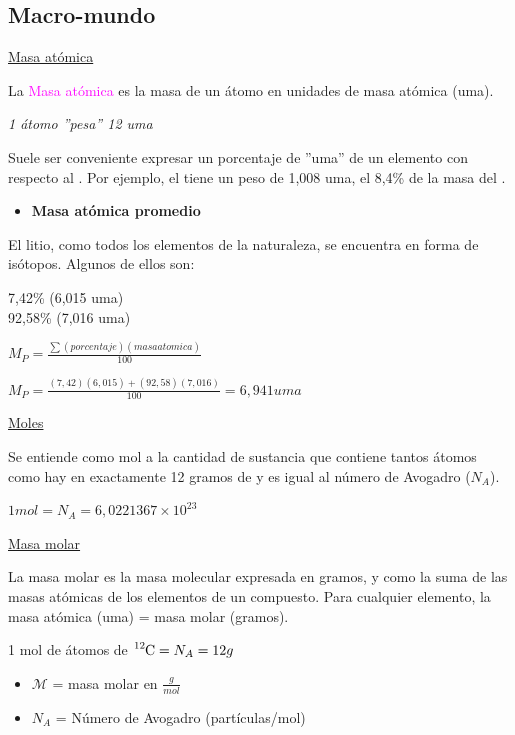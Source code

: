     \subsection{Macro-mundo}
        \begin{center} \underline{Masa atómica} \end{center}
            \indent La \textcolor{magenta}{Masa atómica} es la masa de un átomo en unidades de masa atómica (uma).
            \begin{center} \textit{1 átomo  ''pesa'' 12 uma} \end{center}
            \indent Suele ser conveniente expresar un porcentaje de ''uma'' de un elemento con respecto al . Por ejemplo, el  tiene un peso de 1,008 uma, el 8,4\% de la masa del .
            \begin{itemize} \item \textbf{Masa atómica promedio} \end{itemize}
            \indent El litio, como todos los elementos de la naturaleza, se encuentra en forma de isótopos. Algunos de ellos son: \begin{center} 7,42\%  (6,015 uma) \\ 92,58\%  (7,016 uma) \end{center}
            \begin{center} $M_P = \frac{\sum{(porcentaje)(masa atomica)}}{100}$ \end{center}
            \begin{center} $M_P = \frac{(7,42)(6,015) + (92,58)(7,016)}{100} = 6,941 uma$ \end{center}

        \begin{center} \underline{Moles} \end{center}
            \indent Se entiende como mol a la cantidad de sustancia que contiene tantos átomos como hay en exactamente 12 gramos de  y es igual al número de Avogadro ($N_A$).
            \begin{center} $1 mol = N_A = 6,0221367 \times 10^{23}$ \end{center}

        \begin{center} \underline{Masa molar} \end{center}
            \indent La masa molar es la masa molecular expresada en gramos, y como la suma de las masas atómicas de los elementos de un compuesto. Para cualquier elemento, la masa atómica (uma) = masa molar (gramos).
            \begin{center} 1 mol de átomos de $\ce{^{12}_{}C} = N_A = 12g$ \end{center}
            \begin{itemize}
                \item $\mathcal{M}$ = masa molar en $\frac{g}{mol}$ 
                \item $N_A$ = Número de Avogadro (partículas/mol)
            \end{itemize}

